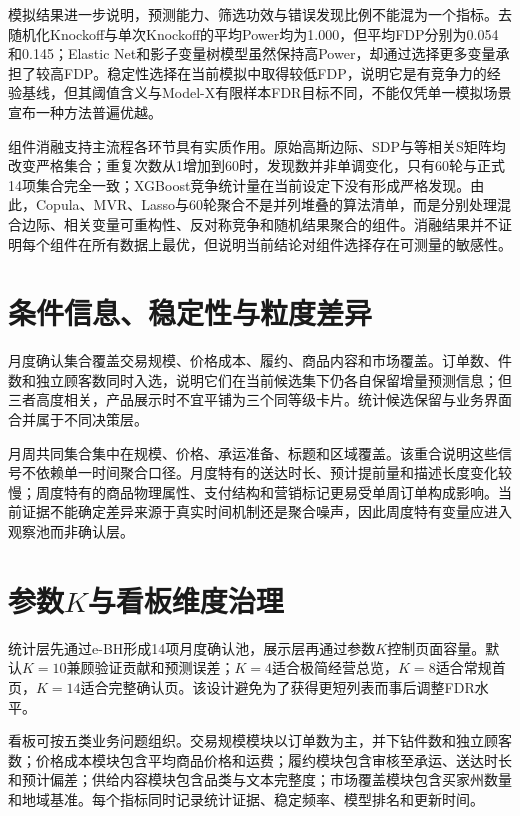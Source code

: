 \documentclass{sufethesismas}
\begin{document}
模拟结果进一步说明，预测能力、筛选功效与错误发现比例不能混为一个指标。去随机化Knockoff与单次Knockoff的平均Power均为1.000，但平均FDP分别为0.054和0.145；Elastic Net和影子变量树模型虽然保持高Power，却通过选择更多变量承担了较高FDP。稳定性选择在当前模拟中取得较低FDP，说明它是有竞争力的经验基线，但其阈值含义与Model-X有限样本FDR目标不同，不能仅凭单一模拟场景宣布一种方法普遍优越。

组件消融支持主流程各环节具有实质作用。原始高斯边际、SDP与等相关S矩阵均改变严格集合；重复次数从1增加到60时，发现数并非单调变化，只有60轮与正式14项集合完全一致；XGBoost竞争统计量在当前设定下没有形成严格发现。由此，Copula、MVR、Lasso与60轮聚合不是并列堆叠的算法清单，而是分别处理混合边际、相关变量可重构性、反对称竞争和随机结果聚合的组件。消融结果并不证明每个组件在所有数据上最优，但说明当前结论对组件选择存在可测量的敏感性。

\section{条件信息、稳定性与粒度差异}

月度确认集合覆盖交易规模、价格成本、履约、商品内容和市场覆盖。订单数、件数和独立顾客数同时入选，说明它们在当前候选集下仍各自保留增量预测信息；但三者高度相关，产品展示时不宜平铺为三个同等级卡片。统计候选保留与业务界面合并属于不同决策层。

月周共同集合集中在规模、价格、承运准备、标题和区域覆盖。该重合说明这些信号不依赖单一时间聚合口径。月度特有的送达时长、预计提前量和描述长度变化较慢；周度特有的商品物理属性、支付结构和营销标记更易受单周订单构成影响。当前证据不能确定差异来源于真实时间机制还是聚合噪声，因此周度特有变量应进入观察池而非确认层。

\section{\texorpdfstring{参数\(K\)与看板维度治理}{参数K与看板维度治理}}

统计层先通过e-BH形成14项月度确认池，展示层再通过参数\(K\)控制页面容量。默认\(K=10\)兼顾验证贡献和预测误差；\(K=4\)适合极简经营总览，\(K=8\)适合常规首页，\(K=14\)适合完整确认页。该设计避免为了获得更短列表而事后调整FDR水平。

看板可按五类业务问题组织。交易规模模块以订单数为主，并下钻件数和独立顾客数；价格成本模块包含平均商品价格和运费；履约模块包含审核至承运、送达时长和预计偏差；供给内容模块包含品类与文本完整度；市场覆盖模块包含买家州数量和地域基准。每个指标同时记录统计证据、稳定频率、模型排名和更新时间。
\end{document}
